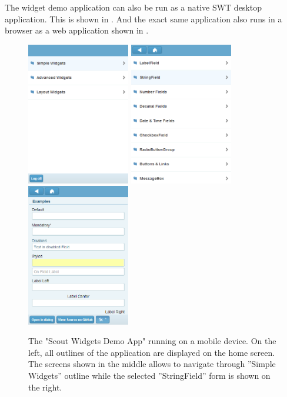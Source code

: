 \documentclass[a4paper,10pt,twoside]{book}
\begin{document}
{The widget demo application can also be run as a native SWT desktop application. 
This is shown in .
And the exact same application also runs in a browser as a web application shown in .

\begin{figure}
\includegraphics[width=4.5cm]{widgetapp_mobile1.png}
\includegraphics[width=4.5cm]{widgetapp_mobile2.png}
\includegraphics[width=4.5cm]{widgetapp_mobile3.png}
\caption{The "Scout Widgets Demo App" running on a mobile device. 
On the left, all outlines of the application are displayed on the home screen.
The screens shown in the middle allows to navigate through ''Simple Widgets'' outline while the selected ''StringField'' form is shown on the right.
}
\end{figure}

}
\end{document}
